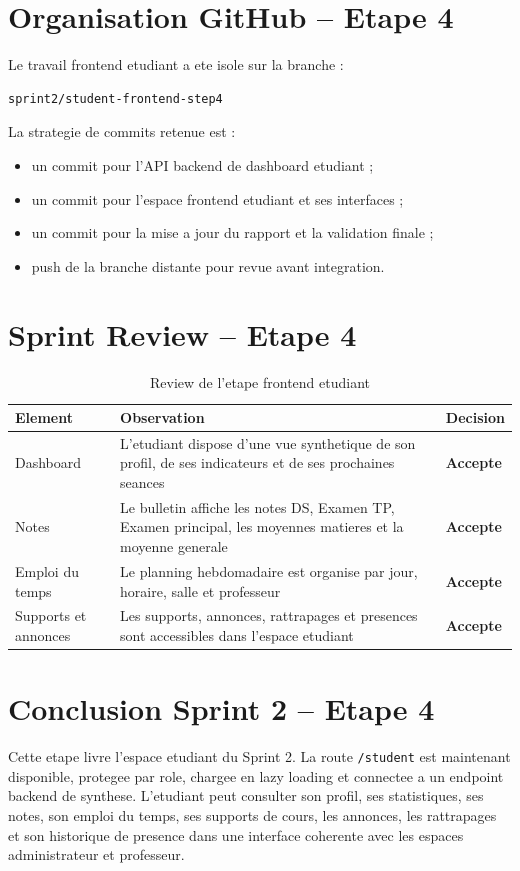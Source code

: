 \documentclass[12pt,a4paper]{report}
\begin{document}
\section{Organisation GitHub -- Etape 4}

Le travail frontend etudiant a ete isole sur la branche :

\begin{verbatim}
sprint2/student-frontend-step4
\end{verbatim}

La strategie de commits retenue est :

\begin{itemize}[itemsep=0.3em]
    \item un commit pour l'API backend de dashboard etudiant ;
    \item un commit pour l'espace frontend etudiant et ses interfaces ;
    \item un commit pour la mise a jour du rapport et la validation finale ;
    \item push de la branche distante pour revue avant integration.
\end{itemize}

\section{Sprint Review -- Etape 4}

\begin{table}[H]
\centering
\caption{Review de l'etape frontend etudiant}
\begin{tabular}{|p{5cm}|p{5cm}|p{3cm}|}
\hline
\textbf{Element} & \textbf{Observation} & \textbf{Decision} \\
\hline
Dashboard & L'etudiant dispose d'une vue synthetique de son profil, de ses indicateurs et de ses prochaines seances & \textbf{Accepte} \\
\hline
Notes & Le bulletin affiche les notes DS, Examen TP, Examen principal, les moyennes matieres et la moyenne generale & \textbf{Accepte} \\
\hline
Emploi du temps & Le planning hebdomadaire est organise par jour, horaire, salle et professeur & \textbf{Accepte} \\
\hline
Supports et annonces & Les supports, annonces, rattrapages et presences sont accessibles dans l'espace etudiant & \textbf{Accepte} \\
\hline
\end{tabular}
\end{table}

\section{Conclusion Sprint 2 -- Etape 4}

Cette etape livre l'espace etudiant du Sprint 2. La route \texttt{/student} est maintenant disponible, protegee par role, chargee en lazy loading et connectee a un endpoint backend de synthese. L'etudiant peut consulter son profil, ses statistiques, ses notes, son emploi du temps, ses supports de cours, les annonces, les rattrapages et son historique de presence dans une interface coherente avec les espaces administrateur et professeur.

\fi
\end{document}
